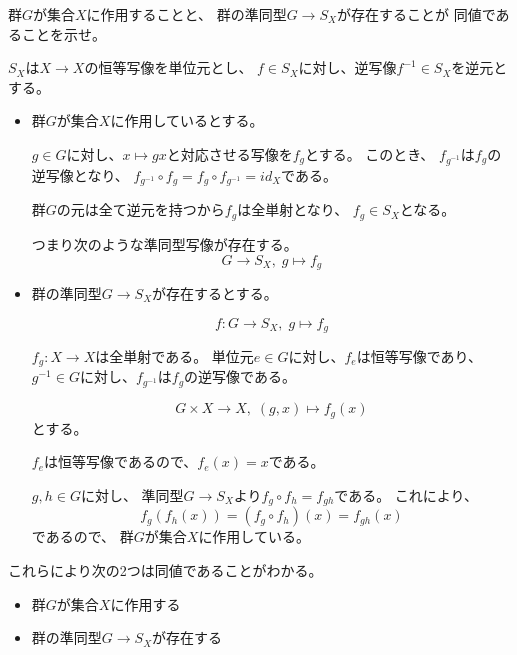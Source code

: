 \documentclass[12pt,b5paper]{ltjsarticle}
\begin{document}
群$G$が集合$X$に作用することと、
群の準同型$G\to S_{X}$が存在することが
同値であることを示せ。

\dotfill

$S_{X}$は$X\to X$の恒等写像を単位元とし、
$f\in S_{X}$に対し、逆写像$f^{-1}\in S_{X}$を逆元とする。


\begin{itemize}
 \item 群$G$が集合$X$に作用しているとする。

       $g\in G$に対し、$x\mapsto gx$と対応させる写像を$f_{g}$とする。
       このとき、
       $f_{g^{-1}}$は$f_{g}$の逆写像となり、
       $f_{g^{-1}} \circ f_{g} = f_{g} \circ f_{g^{-1}} = id_{X}$である。

       群$G$の元は全て逆元を持つから$f_{g}$は全単射となり、
       $f_{g}\in S_{X}$となる。

       つまり次のような準同型写像が存在する。
       \begin{equation}
        G \to S_{X} , \; g \mapsto f_{g}
       \end{equation}

 \item 群の準同型$G\to S_{X}$が存在するとする。

       \begin{equation}
        f: G \to S_{X}, \; g \mapsto f_{g}
       \end{equation}

       $f_{g}:X\to X$は全単射である。
       単位元$e\in G$に対し、$f_{e}$は恒等写像であり、
       $g^{-1}\in G$に対し、$f_{g^{-1}}$は$f_{g}$の逆写像である。

       \begin{equation}
        G\times X \to X , \; (g,x) \mapsto f_{g}(x)
       \end{equation}
       とする。

       $f_{e}$は恒等写像であるので、$f_{e}(x)=x$である。

       $g,h\in G$に対し、
       準同型$G\to S_{X}$より$f_{g}\circ f_{h}=f_{gh}$である。
       これにより、
       \begin{equation}
        f_{g}(f_{h}(x)) = (f_{g}\circ f_{h})(x)= f_{gh}(x)
       \end{equation}
       であるので、
       群$G$が集合$X$に作用している。

\end{itemize}

これらにより次の2つは同値であることがわかる。
\begin{itemize}
 \item 群$G$が集合$X$に作用する
 \item 群の準同型$G\to S_{X}$が存在する
\end{itemize}

\hrulefill
\end{document}
